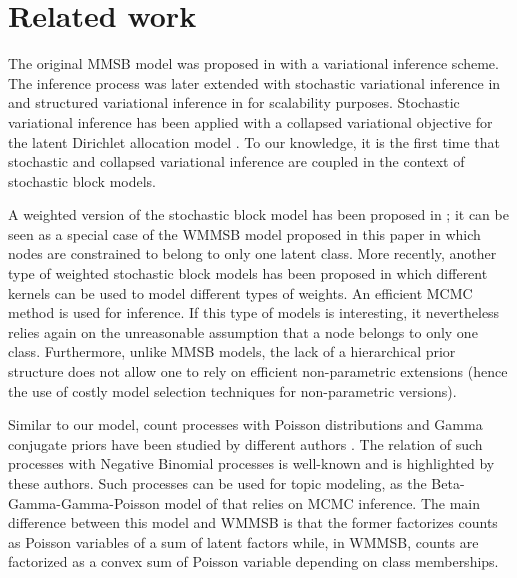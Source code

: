 \section{Related work}
\label{sec:rl}


The original MMSB model was proposed in \cite{airoldi2009mixed} with a variational inference scheme. The inference process was later extended with stochastic variational inference in \cite{gopalan2013efficient} and structured variational inference in \cite{kim2013efficient} for scalability purposes. Stochastic variational inference has been applied with a collapsed variational objective for the latent Dirichlet allocation model \cite{foulds2013stochastic}. To our knowledge, it is the first time that stochastic and collapsed variational inference are coupled in the context of stochastic block models.

A weighted version of the stochastic block model has been proposed in \cite{aicher2014learning}; it can be seen as a special case of the WMMSB model proposed in this paper in which nodes are constrained to belong to only one latent class. More recently, another type of weighted stochastic block models has been proposed \cite{peixoto2018nonparametric} in which different kernels can be used to model different types of weights. An efficient MCMC method is used for inference. If this type of models is interesting, it nevertheless relies again on the unreasonable assumption that a node belongs to only one class. Furthermore, unlike MMSB models, the lack of a hierarchical prior structure does not allow one to rely on efficient non-parametric extensions (hence the use of costly model selection techniques for non-parametric versions).

Similar to our model, count processes with Poisson distributions and Gamma conjugate priors have been studied by different authors \cite{zhou2012augment, zhou2015negative}. The relation of such processes with Negative Binomial processes is well-known and is highlighted by these authors. Such processes can be used for topic modeling, as the Beta-Gamma-Gamma-Poisson model of \cite{zhou2012beta} that relies on MCMC inference. The main difference between this model and WMMSB is that the former factorizes counts as Poisson variables of a sum of latent factors while, in WMMSB, counts are factorized as a convex sum of Poisson variable depending on class memberships.

